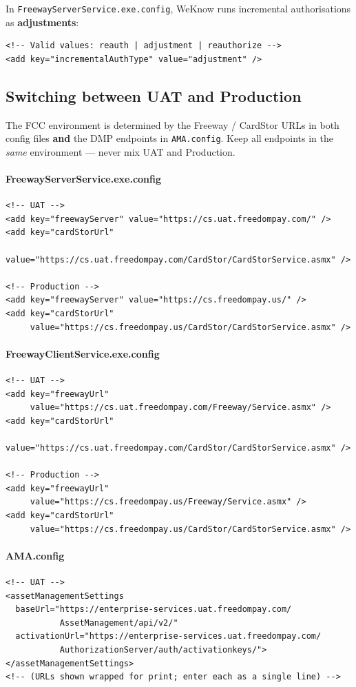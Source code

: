 \documentclass[a4paper,10pt]{article}
\begin{document}
In \texttt{FreewayServerService.exe.config}, WeKnow runs incremental
authorisations as \textbf{adjustments}:

\begin{lstlisting}
<!-- Valid values: reauth | adjustment | reauthorize -->
<add key="incrementalAuthType" value="adjustment" />
\end{lstlisting}

\subsection{Switching between UAT and Production}

The FCC environment is determined by the Freeway / CardStor URLs in both
config files \textbf{and} the DMP endpoints in \texttt{AMA.config}. Keep
all endpoints in the \emph{same} environment --- never mix UAT and
Production.

\paragraph{FreewayServerService.exe.config}
\begin{lstlisting}
<!-- UAT -->
<add key="freewayServer" value="https://cs.uat.freedompay.com/" />
<add key="cardStorUrl"
     value="https://cs.uat.freedompay.com/CardStor/CardStorService.asmx" />

<!-- Production -->
<add key="freewayServer" value="https://cs.freedompay.us/" />
<add key="cardStorUrl"
     value="https://cs.freedompay.us/CardStor/CardStorService.asmx" />
\end{lstlisting}

\paragraph{FreewayClientService.exe.config}
\begin{lstlisting}
<!-- UAT -->
<add key="freewayUrl"
     value="https://cs.uat.freedompay.com/Freeway/Service.asmx" />
<add key="cardStorUrl"
     value="https://cs.uat.freedompay.com/CardStor/CardStorService.asmx" />

<!-- Production -->
<add key="freewayUrl"
     value="https://cs.freedompay.us/Freeway/Service.asmx" />
<add key="cardStorUrl"
     value="https://cs.freedompay.us/CardStor/CardStorService.asmx" />
\end{lstlisting}

\paragraph{AMA.config}
\begin{lstlisting}
<!-- UAT -->
<assetManagementSettings
  baseUrl="https://enterprise-services.uat.freedompay.com/
           AssetManagement/api/v2/"
  activationUrl="https://enterprise-services.uat.freedompay.com/
           AuthorizationServer/auth/activationkeys/">
</assetManagementSettings>
<!-- (URLs shown wrapped for print; enter each as a single line) -->
\end{lstlisting}
\end{document}
